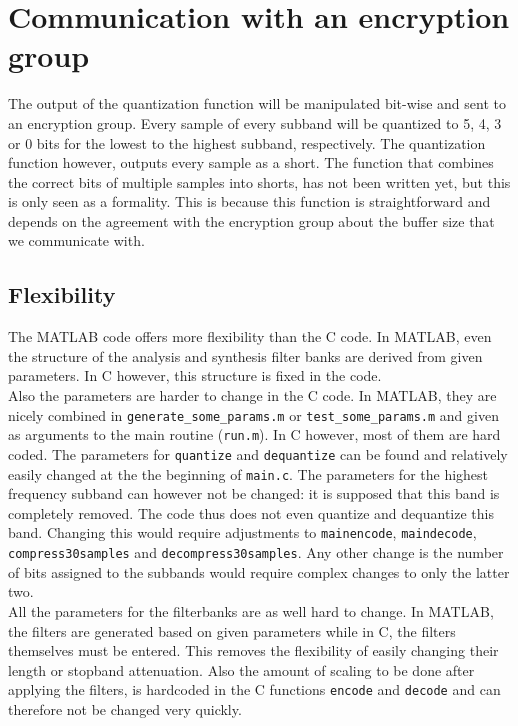 \documentclass[a4paper]{article}
\begin{document}
\section{Communication with an encryption group}
The output of the quantization function will be manipulated bit-wise  and sent to an encryption group. Every sample of every subband will be quantized to 5, 4, 3 or 0 bits for the lowest to the highest subband, respectively. The quantization function however, outputs every sample as a short. The function that combines the correct bits of multiple samples into shorts, has not been written yet, but this is only seen as a formality. This is because this function is straightforward and depends on the agreement with the encryption group about the buffer size that we communicate with.

\subsection{Flexibility}
The MATLAB code offers more flexibility than the C code. In MATLAB, even the structure of the analysis and synthesis filter banks are derived from given parameters. In C however, this structure is fixed in the code.\\

Also the parameters are harder to change in the C code. In MATLAB, they are nicely combined in \texttt{generate\_some\_params.m} or \texttt{test\_some\_params.m} and given as arguments to the main routine (\texttt{run.m}). In C however, most of them are hard coded. The parameters for \texttt{quantize} and \texttt{dequantize} can be found and relatively easily changed at the the beginning of \texttt{main.c}. The parameters for the highest frequency subband can however not be changed: it is supposed that this band is completely removed. The code thus does not even quantize and dequantize this band. Changing this would require adjustments to \texttt{mainencode}, \texttt{maindecode}, \texttt{compress30samples} and \texttt{decompress30samples}. Any other change is the number of bits assigned to the subbands would require complex changes to only the latter two.\\

All the parameters for the filterbanks are as well hard to change. In MATLAB, the filters are generated based on given parameters while in C, the filters themselves must be entered. This removes the flexibility of easily changing their length or stopband attenuation. Also the amount of scaling to be done after applying the filters, is hardcoded in the C functions \texttt{encode} and \texttt{decode} and can therefore not be changed very quickly.
\end{document}
